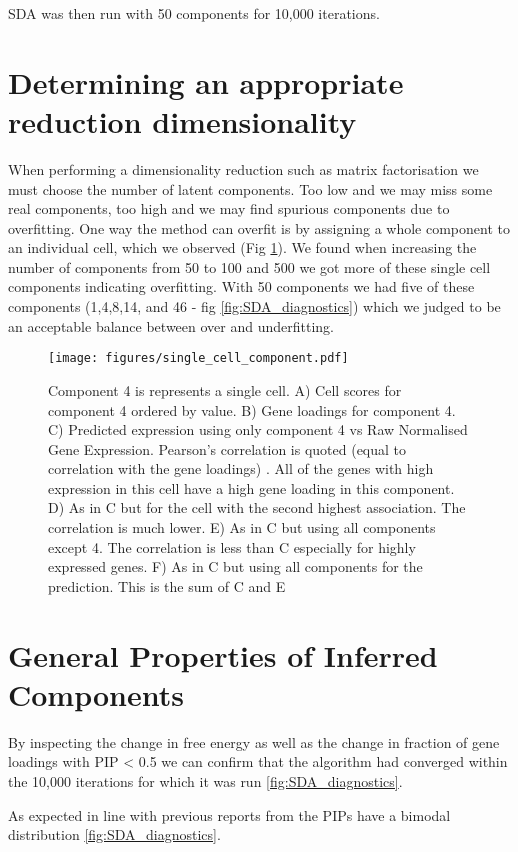SDA was then run with 50 components for 10,000 iterations.

\section{Determining an appropriate reduction dimensionality}

When performing a dimensionality reduction such as matrix factorisation we must choose the number of latent components. Too low and we may miss some real components, too high and we may find spurious components due to overfitting. One way the method can overfit is by assigning a whole component to an individual cell, which we observed (Fig \ref{fig:single_cell_component}). We found when increasing the number of components from 50 to 100 and 500 we got more of these single cell components indicating overfitting. With 50 components we had five of these components (1,4,8,14, and 46 - fig \ref{fig:SDA_diagnostics}) which we judged to be an acceptable balance between over and underfitting.

\begin{figure}[H]
	\centering
	\texttt{[image: figures/single\_cell\_component.pdf]}
	\caption{Component 4 is represents a single cell. A) Cell scores for component 4 ordered by value. B) Gene loadings for component 4. C) Predicted expression using only component 4 vs Raw Normalised Gene Expression. Pearson's correlation is quoted (equal to correlation with the gene loadings) . All of the genes with high expression in this cell have a high gene loading in this component. D) As in C but for the cell with the second highest association. The correlation is much lower. E) As in C but using all components except 4. The correlation is less than C especially for highly expressed genes. F) As in C but using all components for the prediction.  This is the sum of C and E}
	\label{fig:single_cell_component}
\end{figure}

\section{General Properties of Inferred Components}

By inspecting the change in free energy as well as the change in fraction of gene loadings with PIP < 0.5 we can confirm that the algorithm had converged within the 10,000 iterations for which it was run \ref{fig:SDA_diagnostics}.

As expected in line with previous reports from \cite{Hore2016Tensor} the PIPs have a bimodal distribution \ref{fig:SDA_diagnostics}.

